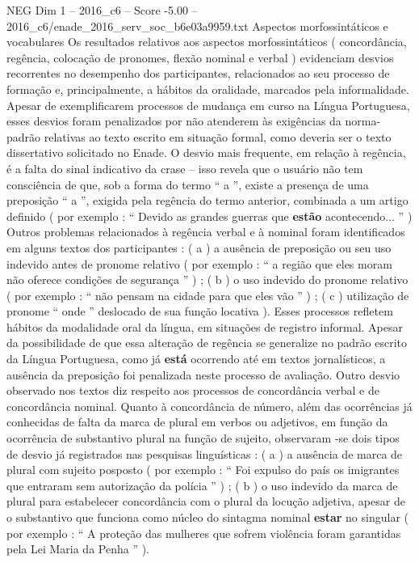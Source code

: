 \begin{textsample}{NEG Dim 1 – 2016\_c6 – Score -5.00 – 2016\_c6/enade\_2016\_serv\_soc\_b6e03a9959.txt}
Aspectos morfossintáticos e vocabulares Os resultados relativos aos aspectos morfossintáticos ( concordância, regência, colocação de pronomes, flexão nominal e verbal ) evidenciam desvios recorrentes no desempenho dos participantes, relacionados ao seu processo de formação e, principalmente, a hábitos da oralidade, marcados pela informalidade.
Apesar de exemplificarem processos de mudança em curso na Língua Portuguesa, esses desvios foram penalizados por não atenderem às exigências da norma-padrão relativas ao texto escrito em situação formal, como deveria ser o texto dissertativo solicitado no Enade.
O desvio mais frequente, em relação à regência, é a falta do sinal indicativo da crase – isso revela que o usuário não tem consciência de que, sob a forma do termo “ a ”, existe a presença de uma preposição “ a ”, exigida pela regência do termo anterior, combinada a um artigo definido ( por exemplo : “ Devido as grandes guerras que \textbf{estão} acontecendo... ” ) Outros problemas relacionados à regência verbal e à nominal foram identificados em alguns textos dos participantes : ( a ) a ausência de preposição ou seu uso indevido antes de pronome relativo ( por exemplo : “ a região que eles moram não oferece condições de segurança ” ) ; ( b ) o uso indevido do pronome relativo ( por exemplo : “ não pensam na cidade para que eles vão ” ) ; ( c ) utilização de pronome “ onde ” deslocado de sua função locativa ).
Esses processos refletem hábitos da modalidade oral da língua, em situações de registro informal.
Apesar da possibilidade de que essa alteração de regência se generalize no padrão escrito da Língua Portuguesa, como já \textbf{está} ocorrendo até em textos jornalísticos, a ausência da preposição foi penalizada neste processo de avaliação.
Outro desvio observado nos textos diz respeito aos processos de concordância verbal e de concordância nominal.
Quanto à concordância de número, além das ocorrências já conhecidas de falta da marca de plural em verbos ou adjetivos, em função da ocorrência de substantivo plural na função de sujeito, observaram -se dois tipos de desvio já registrados nas pesquisas linguísticas : ( a ) a ausência de marca de plural com sujeito posposto ( por exemplo : “ Foi expulso do país os imigrantes que entraram sem autorização da polícia ” ) ; ( b ) o uso indevido da marca de plural para estabelecer concordância com o plural da locução adjetiva, apesar de o substantivo que funciona como núcleo do sintagma nominal \textbf{estar} no singular ( por exemplo : “ A proteção das mulheres que sofrem violência foram garantidas pela Lei Maria da Penha ” ).

\end{textsample}
